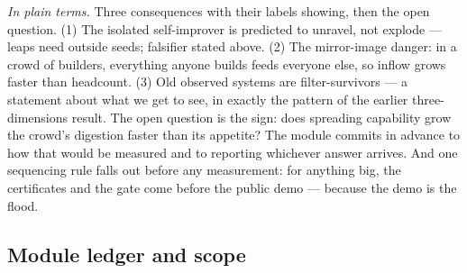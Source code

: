 \documentclass[11pt]{article}
\theoremstyle{definition}
\newcommand{\plainterms}{\emph{In plain terms.}}
\begin{document}
\noindent\plainterms{} Three consequences with their labels showing, then the open question. (1) The isolated self-improver is predicted to unravel, not explode --- leaps need outside seeds; falsifier stated above. (2) The mirror-image danger: in a crowd of builders, everything anyone builds feeds everyone else, so inflow grows faster than headcount. (3) Old observed systems are filter-survivors --- a statement about what we get to see, in exactly the pattern of the earlier three-dimensions result. The open question is the sign: does spreading capability grow the crowd's digestion faster than its appetite? The module commits in advance to how that would be measured and to reporting whichever answer arrives. And one sequencing rule falls out before any measurement: for anything big, the certificates and the gate come before the public demo --- because the demo is the flood.

\subsection{Module ledger and scope}
\end{document}
